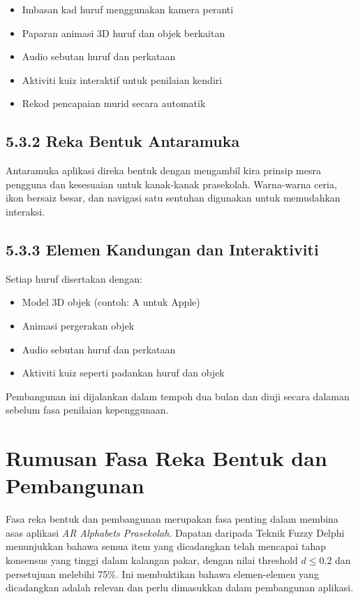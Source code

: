 {{\begin{itemize}
  \item Imbasan kad huruf menggunakan kamera peranti
  \item Paparan animasi 3D huruf dan objek berkaitan
  \item Audio sebutan huruf dan perkataan
  \item Aktiviti kuiz interaktif untuk penilaian kendiri
  \item Rekod pencapaian murid secara automatik
\end{itemize}

\subsection*{5.3.2 Reka Bentuk Antaramuka}

Antaramuka aplikasi direka bentuk dengan mengambil kira prinsip mesra pengguna dan kesesuaian untuk kanak-kanak prasekolah. Warna-warna ceria, ikon bersaiz besar, dan navigasi satu sentuhan digunakan untuk memudahkan interaksi.

\subsection*{5.3.3 Elemen Kandungan dan Interaktiviti}

Setiap huruf disertakan dengan:

\begin{itemize}
  \item Model 3D objek (contoh: A untuk Apple)
  \item Animasi pergerakan objek
  \item Audio sebutan huruf dan perkataan
  \item Aktiviti kuiz seperti padankan huruf dan objek
\end{itemize}

Pembangunan ini dijalankan dalam tempoh dua bulan dan diuji secara dalaman sebelum fasa penilaian kepenggunaan.

\section{Rumusan Fasa Reka Bentuk dan Pembangunan}

Fasa reka bentuk dan pembangunan merupakan fasa penting dalam membina asas aplikasi \textit{AR Alphabets Prasekolah}. Dapatan daripada Teknik Fuzzy Delphi menunjukkan bahawa semua item yang dicadangkan telah mencapai tahap konsensus yang tinggi dalam kalangan pakar, dengan nilai threshold \(d \leq 0.2\) dan persetujuan melebihi 75\%. Ini membuktikan bahawa elemen-elemen yang dicadangkan adalah relevan dan perlu dimasukkan dalam pembangunan aplikasi.

}}
